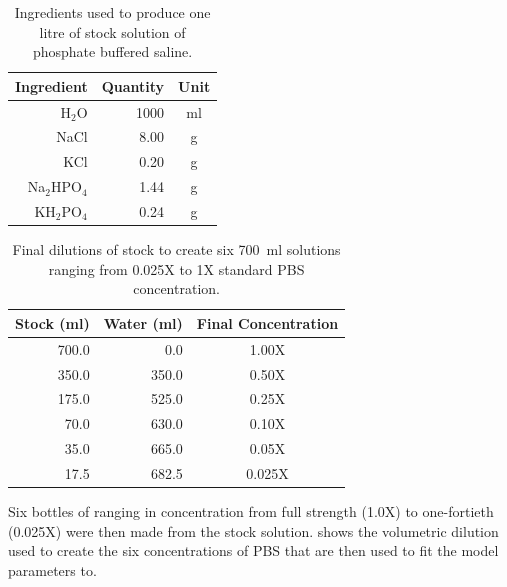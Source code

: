   \begin{table}
    \centering
    \begin{tabular}{r | r | c}
      Ingredient & Quantity & Unit \\
      \hline
      H$_2$O & 1000 & ml \\
      NaCl & 8.00  & g  \\
      KCl  & 0.20  & g  \\
      Na$_2$HPO$_4$ & 1.44 & g \\
      KH$_2$PO$_4$  & 0.24 & g \\
    \end{tabular}
    \caption{\label{tab:pt2-PBS-recipe}Ingredients used to produce one litre of stock solution of phosphate buffered saline.}
  \end{table}

  \begin{table}
    \centering
    \begin{tabular}{r | r | c}
      Stock (ml) & Water (ml) & Final Concentration \\
      \hline
      700.0 &   0.0 & 1.00X \\
      350.0 & 350.0 & 0.50X \\
      175.0 & 525.0 & 0.25X \\
       70.0 & 630.0 & 0.10X \\
       35.0 & 665.0 & 0.05X \\
       17.5 & 682.5 & 0.025X\\
    \end{tabular}
    \caption{\label{tab:pt2-PBS-concentration}Final dilutions of stock to create six \SI{700}{\milli\litre} solutions ranging from 0.025X to 1X standard PBS concentration.}
  \end{table}

  Six bottles of ranging in concentration from full strength (1.0X) to one-fortieth (0.025X) were then made from the stock solution.
   shows the volumetric dilution used to create the six concentrations of PBS that are then used to fit the model parameters to.


